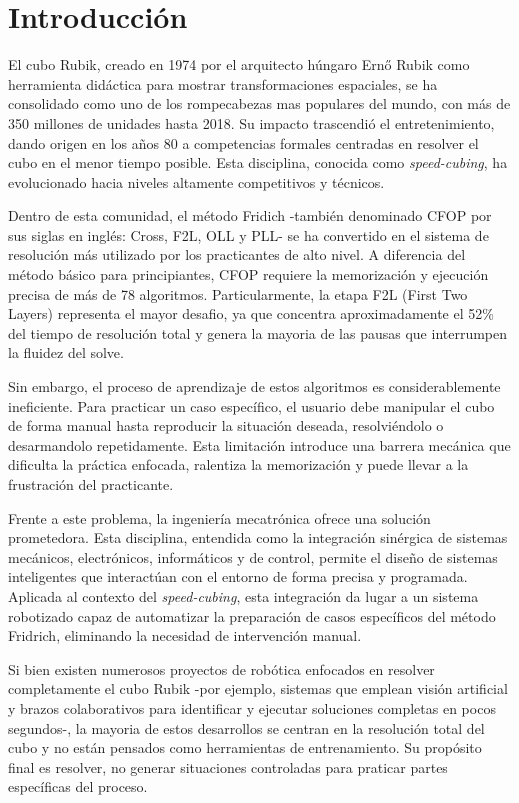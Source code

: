 \section{Introducción}
El cubo Rubik, creado en 1974 por el arquitecto húngaro Ernő Rubik como herramienta didáctica para mostrar transformaciones espaciales, se ha consolidado como uno de los rompecabezas mas populares del mundo, con más de 350 millones de unidades hasta 2018\cite{Reese2020}. Su impacto trascendió el entretenimiento, dando origen en los años 80 a competencias formales centradas en resolver el cubo en el menor tiempo posible. Esta disciplina, conocida como \textit{speed-cubing}, ha evolucionado hacia niveles altamente competitivos y técnicos.

Dentro de esta comunidad, el método Fridich -también denominado CFOP por sus siglas en inglés: Cross, F2L, OLL y PLL- se ha convertido en el sistema de resolución más utilizado por los practicantes de alto nivel\cite{Boyce2022b}. A diferencia del método básico para principiantes, CFOP requiere la memorización y ejecución precisa de más de 78 algoritmos. Particularmente, la etapa F2L (First Two Layers) representa el mayor desafio, ya que concentra aproximadamente el 52\% del tiempo de resolución total y genera la mayoria de las pausas que interrumpen la fluidez del solve\cite{Boyce2022b}.

Sin embargo, el proceso de aprendizaje de estos algoritmos es considerablemente ineficiente. Para practicar un caso específico, el usuario debe manipular el cubo de forma manual hasta reproducir la situación deseada, resolviéndolo o desarmandolo repetidamente. Esta limitación introduce una barrera mecánica que dificulta la práctica enfocada, ralentiza la memorización y puede llevar a la frustración del practicante.

Frente a este problema, la ingeniería mecatrónica ofrece una solución prometedora. Esta disciplina, entendida como la integración sinérgica de sistemas mecánicos, electrónicos, informáticos y de control, permite el diseño de sistemas inteligentes que interactúan con el entorno de forma precisa y programada\cite{Perdomo2003}. Aplicada al contexto del \textit{speed-cubing}, esta integración da lugar a un sistema robotizado capaz de automatizar la preparación de casos específicos del método Fridrich, eliminando la necesidad de intervención manual.

Si bien existen numerosos proyectos de robótica enfocados en resolver completamente el cubo Rubik -por ejemplo, sistemas que emplean visión artificial y brazos colaborativos para identificar y ejecutar soluciones completas en pocos segundos\cite{Gorriz2023}-, la mayoria de estos desarrollos se centran en la resolución total del cubo y no están pensados como herramientas de entrenamiento. Su propósito final es resolver, no generar situaciones controladas para praticar partes específicas del proceso. 

